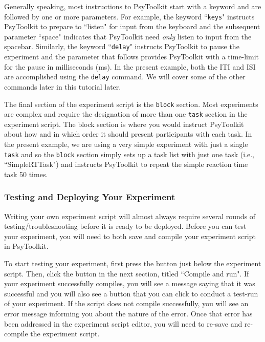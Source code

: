 Generally speaking, most instructions to PsyToolkit start with a keyword and are followed by one or more parameters.  For example, the keyword ``\texttt{keys}" instructs PsyToolkit to prepare to ``listen" for input from the keyboard and the subsequent parameter ``space" indicates that PsyToolkit need \emph{only} listen to input from the spacebar.  Similarly, the keyword ``\texttt{delay}" instructs PsyToolkit to pause the experiment and the parameter that follows provides PsyToolkit with a time-limit for the pause in milliseconds (ms).  In the present example, both the ITI and ISI are accomplished using the \texttt{delay} command.  We will cover some of the other commands later in this tutorial later.  

The final section of the experiment script is the \texttt{block} section.  Most experiments are complex and require the designation of more than one \texttt{task} section in the experiment script. The block section is where you would instruct PsyToolkit about how and in which order it should present participants with each task.  In the present example, we are using a very simple experiment with just a single \texttt{task} and so the \texttt{block} section simply sets up a task list with just one task (i.e., ``SimpleRTTask") and instructs PsyToolkit to repeat the simple reaction time task 50 times.

\subsubsection{Testing and Deploying Your Experiment}
Writing your own experiment script will almost always require several rounds of testing/troubleshooting before it is ready to be deployed.  Before you can test your experiment, you will need to both save and compile your experiment script in PsyToolkit.

To start testing your experiment, first press the  button just below the experiment script.  Then, click the  button in the next section, titled ``Compile and run".  If your experiment successfully compiles, you will see a message saying that it was successful and you will also see a  button that you can click to conduct a test-run of your experiment.  If the script does not compile successfully, you will see an error message informing you about the nature of the error.  Once that error has been addressed in the experiment script editor, you will need to re-save and re-compile the experiment script.

